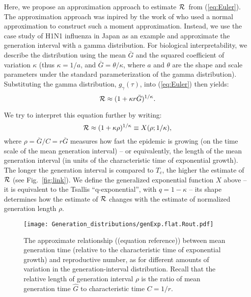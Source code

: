 \documentclass[12pt,]{article}
\newcommand{\RR}{\ensuremath{{\cal R}}}
\newcommand{\Tc}{\ensuremath{C}}
\newcommand{\eref}[1]{(\ref{eq:#1})}
\newcommand{\fref}[1]{Fig.~\ref{fig:#1}}
\begin{document}
Here, we propose an approximation approach to estimate \RR\ from \eref{Euler}. 
The approximation approach was inpired by the work of \cite{WallLips07} who used a normal approximation to construct such a moment approximation. 
Instead, we use the case study of H1N1 influenza in Japan \cite{NishCast09} as an example and approximate the generation interval with a gamma distribution.
For biological interpretability, we describe the distribution using the mean $\bar G$ and the squared coefficient of variation $\kappa$ (thus $\kappa = 1/a$, and $\bar G = \theta/\kappa$, where $a$ and $\theta$ are the shape and scale parameters under the standard parameterization of the gamma distribution).
Substituting the gamma distribution, $g_{\gamma}(\tau)$, into \eref{Euler} then yields:
\begin{equation}
	\RR \approx (1 + \kappa r \bar G)^{1/\kappa}.
	\label{eq:gamApp}
\end{equation}

We try to interpret this equation further by writing:
\begin{equation}
	\RR \approx (1 + \kappa \rho)^{1/\kappa} \equiv X(\rho; 1/\kappa),
	\label{eq:genExp}
\end{equation}
where $\rho = \bar G/\Tc = r\bar G$ measures how fast the epidemic is growing (on the time scale of the mean generation interval) -- or equivalently, the length of the mean generation interval (in units of the characteristic time of exponential growth).
The longer the generation interval is compared to $T_c$, the higher the estimate of $\RR$ (see \fref{link}).
We define the generalized exponential function $X$ above -- it is equivalent to the Tsallis ``q-exponential'', with $q=1-\kappa$ \cite{tsallis1994numbers} -- its shape determines how the estimate of $\RR$ changes with the estimate of normalized generation length $\rho$.

\begin{figure}[htbp]
	\centering \texttt{[image: Generation\_distributions/genExp.flat.Rout.pdf]}
	\caption{
		The approximate relationship ((equation reference)) between mean
		generation time (relative to the characteristic time of
		exponential growth) and reproductive number, as for different
		amounts of variation in the generation-interval
		distribution. 
		Recall that the 
		relative length of generation interval $\rho$ is the ratio of
		mean generation time $\hat G$ to characteristic time $C = 1/r$.
	} \label{fig:genExp} 
\end{figure}
\end{document}
